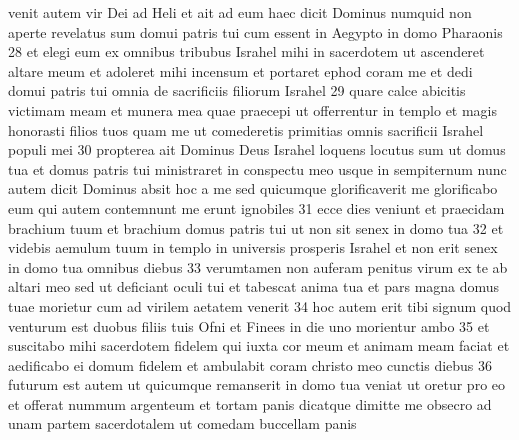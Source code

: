  venit autem vir Dei ad Heli et ait ad eum haec dicit Dominus numquid non aperte revelatus sum domui patris tui cum essent in Aegypto in domo Pharaonis  28 et elegi eum ex omnibus tribubus Israhel mihi in sacerdotem ut ascenderet altare meum et adoleret mihi incensum et portaret ephod coram me et dedi domui patris tui omnia de sacrificiis filiorum Israhel  29 quare calce abicitis victimam meam et munera mea quae praecepi ut offerrentur in templo et magis honorasti filios tuos quam me ut comederetis primitias omnis sacrificii Israhel populi mei  30 propterea ait Dominus Deus Israhel loquens locutus sum ut domus tua et domus patris tui ministraret in conspectu meo usque in sempiternum nunc autem dicit Dominus absit hoc a me sed quicumque glorificaverit me glorificabo eum qui autem contemnunt me erunt ignobiles  31 ecce dies veniunt et praecidam brachium tuum et brachium domus patris tui ut non sit senex in domo tua  32 et videbis aemulum tuum in templo in universis prosperis Israhel et non erit senex in domo tua omnibus diebus  33 verumtamen non auferam penitus virum ex te ab altari meo sed ut deficiant oculi tui et tabescat anima tua et pars magna domus tuae morietur cum ad virilem aetatem venerit  34 hoc autem erit tibi signum quod venturum est duobus filiis tuis Ofni et Finees in die uno morientur ambo  35 et suscitabo mihi sacerdotem fidelem qui iuxta cor meum et animam meam faciat et aedificabo ei domum fidelem et ambulabit coram christo meo cunctis diebus  36 futurum est autem ut quicumque remanserit in domo tua veniat ut oretur pro eo et offerat nummum argenteum et tortam panis dicatque dimitte me obsecro ad unam partem sacerdotalem ut comedam buccellam panis\pend

\endnumbering
